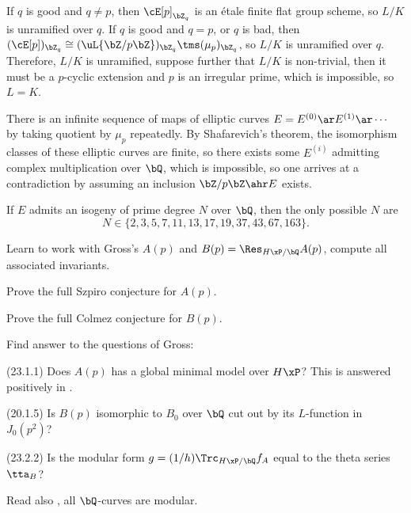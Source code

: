 \documentclass[article, a4paper, twoside]{universal}
\begin{document}
\begin{prf}
	If $q$ is good and $q\neq p$, then $\cE[p]_{\bZ_{q}}$ is an {\'e}tale finite flat group scheme, so $L/K$ is unramified over $q$. If $q$ is good and $q=p$, or $q$ is bad, then $(\cE[p])_{\bZ_{q}}\cong(\uL{\bZ/p\bZ})_{\bZ_{q}}\tms(\mu_{p})_{\bZ_{q}}$, so $L/K$ is unramified over $q$. Therefore, $L/K$ is unramified, suppose further that $L/K$ is non-trivial, then it must be a $p$-cyclic extension and $p$ is an irregular prime, which is impossible, so $L=K$.

	 There is an infinite sequence of maps of elliptic curves $E=E^{(0)}\ar E^{(1)}\ar\cdots$ by taking quotient by $\mu_{p}$ repeatedly. By Shafarevich's theorem, the isomorphism classes of these elliptic curves are finite, so there exists some $E^{(i)}$ admitting complex multiplication over $\bQ$, which is impossible, so one arrives at a contradiction by assuming an inclusion $\bZ/p\bZ\ahr E$ exists.
\end{prf}

\begin{prf}
	If $E$ admits an isogeny of prime degree $N$ over $\bQ$, then the only possible $N$ are
		\[
			N\in\{2,3,5,7,11,13,17,19,37,43,67,163\}.
		\]
\end{prf}






\begin{itm}
	\item[\TODO] Learn to work with Gross's $A(p)$ and $B(p)=\Res_{H\xP/\bQ}A(p)$, compute all associated invariants.
	\item[\HOLD] Prove the full Szpiro conjecture for $A(p)$.
	\item[\HOLD] Prove the full Colmez conjecture for $B(p)$.
	\item[\TODO] Find answer to the questions of Gross:
	\begin{itm}
		\item[\DONE] (23.1.1) Does $A(p)$ has a global minimal model over $H\xP$? This is answered positively in \cite{Gross1982Minimal}.
		\item[\TODO] (20.1.5) Is $B(p)$ isomorphic to $B_{0}$ over $\bQ$ cut out by its $L$-function in $J_{0}(p^{2})$?
		\item[\TODO] (23.2.2) Is the modular form $g=(1/h)\Trc_{H\xP/\bQ}f_{A}$ equal to the theta series $\tta_{B}$?
	\end{itm}
\end{itm}
\begin{rmk}
	Read also \cite[6.2]{Ribet1992}, all $\bQ$-curves are modular.
\end{rmk}
\end{document}

